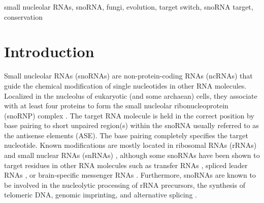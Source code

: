\documentclass[preprint,3p,times,twocolumn]{elsarticle}
\newcommand{\SB}[1]{\begingroup\color{turquoise}#1\endgroup}
\newcommand{\url}[1]{\texttt{\small #1}}
\newcommand{\sno}{snoRNA}
\begin{document}
\begin{frontmatter}
\begin{abstract}
\SB{Small nucleolar RNAs (snoRNAs) are essential players in the rRNA
  biogenesis through their involvement in the nucleolytic processing of
  the precursor and the subsequent guidance of nucleoside
  modifications. Within the kingdom of fungi, several species-specific
  surveys explore their snoRNA repertoire. However, the wide range of
  the snoRNA landscape spanning all major fungal lineages has not been
  mapped so far, mainly because of missing tools for automatized \sno\
  detection and functional analysis. Here, we report a comprehensive
  inventory of fungal \sno s with an in-depth investigation of their
  evolutionary history including innovations, deletions, and target
  switches. This large-scale analysis, incorporating more than 120
  \sno\ families with more than 7700 individual \sno\ sequences, shows
  apparently that the shape of the landscape is subject to consistent
  re-arrangements and adaptations, e.g., through lineage-specific
  targets and redundant guiding functions.}

  An electronic supplement containing the data sets used and produced in
  this study is available at
  \url{http://www.bioinf.uni-leipzig.de/publications/supplements/17-001}. 
\end{abstract}

\begin{keyword}
  small nucleolar RNAs, snoRNA, fungi, evolution, target switch, snoRNA target, 	
  conservation	
\end{keyword}

\end{frontmatter}


\section{Introduction}

Small nucleolar RNAs (snoRNAs) are non-protein-coding RNAs (ncRNAs)
that guide the chemical modification of single nucleotides in other
RNA molecules.  Localized in the nucleolus of eukaryotic (and some
archaean) cells, they associate with at least four proteins to form
the small nucleolar ribonucleoprotein (snoRNP) complex
\cite{Reichow:2007}.  The target RNA molecule is held in the correct
position by base pairing to short unpaired region(s) within the snoRNA
usually referred to as the antisense elements (ASE). The base pairing
completely specifies the target nucleotide. \SB{Known modifications
are mostly located in ribosomal RNAs (rRNAs) and small nuclear RNAs
(snRNAs) \cite{Decatur:2002, Darzacq:2002, Bratkovi:2011}, although
some snoRNAs have been shown to target residues in other RNA molecules
such as transfer RNAs \cite{Clouet_d'Orval:2001, Dennis:2001}, spliced
leader RNAs \cite{Uliel:2004}, or brain-specific messenger RNAs
\cite{Cavaillé:2000, Kishore:2006}. Furthermore, \sno s are known to
be involved in the nucleolytic processing of rRNA precursors, the
synthesis of telomeric DNA, genomic imprinting, and alternative
splicing \cite{Maxwell:1995, Tollervey:1997, Kiss:2002, Matera:2007}.}
\end{document}
